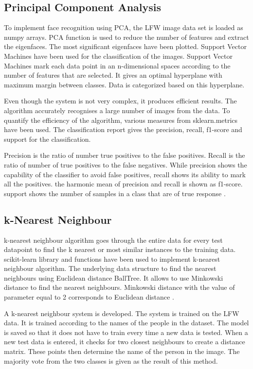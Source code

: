 \documentclass[conference]{IEEEtran}
\begin{document}
\subsection{Principal Component Analysis} 
\label{subsec: 4b. Principal Component Analysis}
To implement face recognition using PCA, the LFW image data set is loaded as numpy arrays. PCA function is used to reduce the number of features and extract the eigenfaces. The most significant eigenfaces have been plotted. Support Vector Machines have been used for the classification of the images. Support Vector Machines mark each data point in an n-dimensional spaces according to the number of features that are selected. It gives an optimal hyperplane with maximum margin between classes. Data is categorized based on this hyperplane.


Even though the system is not very complex, it produces efficient results. The algorithm accurately recognises a large number of images from the data. To quantify the efficiency of the algorithm, various measures from sklearn.metrics have been used. The classification report gives the precision, recall, f1-score and support for the classification. 

Precision is the ratio of number true positives to the false positives. Recall is the ratio of number of true positives to the false negatives. While precision shows the capability of the classifier to avoid false positives, recall shows its ability to mark all the positives. the harmonic mean of precision and recall is shown as f1-score. support shows the number of samples in a class that are of true response \cite{scikit-learn}.

\subsection{k-Nearest Neighbour} 
\label{subsec: 4c k-Nearest Neighbour}
k-nearest neighbour algorithm goes through the entire data for every test datapoint to find the k nearest or most similar instances to the training data. scikit-learn library and functions have been used to implement k-nearest neighbour algorithm. The underlying data structure to find the nearest neighbours using Euclidean distance BallTree. It allows to use Minkowski distance to find the nearest neighbours. Minkowski distance with the value of parameter equal to 2 corresponds to Euclidean distance \cite{weinberger2006distance}.

A k-nearest neighbour system is developed. The system is trained on the LFW data. It is trained according to the names of the people in the dataset. The model is saved so that it does not have to train every time a new data is tested. When a new test data is entered, it checks for two closest neighbours to create a distance matrix. These points then determine the name of the person in the image. The majority vote from the two classes is given as the result of this method.
	
\end{document}
